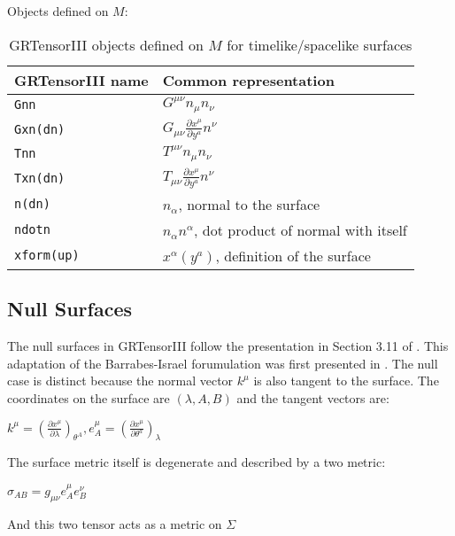 \documentclass{article}
\begin{document}
Objects defined on $M$:
\begin{table}[h]
  \begin{center}
    \begin{tabular}{ll}\hline\hline
      \textbf{GRTensorIII name} & \textbf{Common representation}\\ \hline
      \texttt{Gnn}        & $G^{\mu \nu} n_\mu n_\nu $  \\
      \texttt{Gxn(dn)}        & $G_{\mu \nu} \frac{\partial x^\mu}{\partial y^a} n^\nu $  \\
      \texttt{Tnn}        & $T^{\mu \nu} n_\mu n_\nu $  \\
      \texttt{Txn(dn)}        & $T_{\mu \nu} \frac{\partial x^\mu}{\partial y^a} n^\nu $  \\
      \texttt{n(dn) }      & $n_\alpha$, normal to the surface   \\    
      \texttt{ndotn }      & $n_\alpha n^\alpha$, dot product of normal with itself   \\    
      \texttt{xform(up)}        & $x^\alpha(y^a)$, definition of the surface  \\    
    \end{tabular}
    \caption{GRTensorIII objects defined on $M$ for timelike/spacelike surfaces}
    \label{tab:ts2}
  \end{center}
\end{table}

\FloatBarrier
\subsection{Null Surfaces}
The null surfaces in GRTensorIII follow the presentation in Section 3.11 of \cite{poisson:2004}. This adaptation of the 
Barrabes-Israel forumulation \cite{barrabesisrael:1991} was first presented in \cite{poisson:2002}. The null case is distinct because the 
normal vector $k^\mu$ is also tangent to the surface. The coordinates on the surface are $(\lambda, A, B)$ and the 
tangent vectors are:
\begin{center}
$k^\mu = \left( \frac{\partial x^\mu}{\partial \lambda} \right)_{\theta^A}, 
e^\mu_A = \left( \frac{\partial x^\mu}{\partial \theta^a} \right)_{\lambda}$
\end{center}

The surface metric itself is degenerate and described by a two metric:
\begin{center}
$\sigma_{AB} = g_{\mu \nu} e^\mu_A e^\nu_B$
\end{center}
And this two tensor acts as a metric on $\Sigma$
\end{document}
